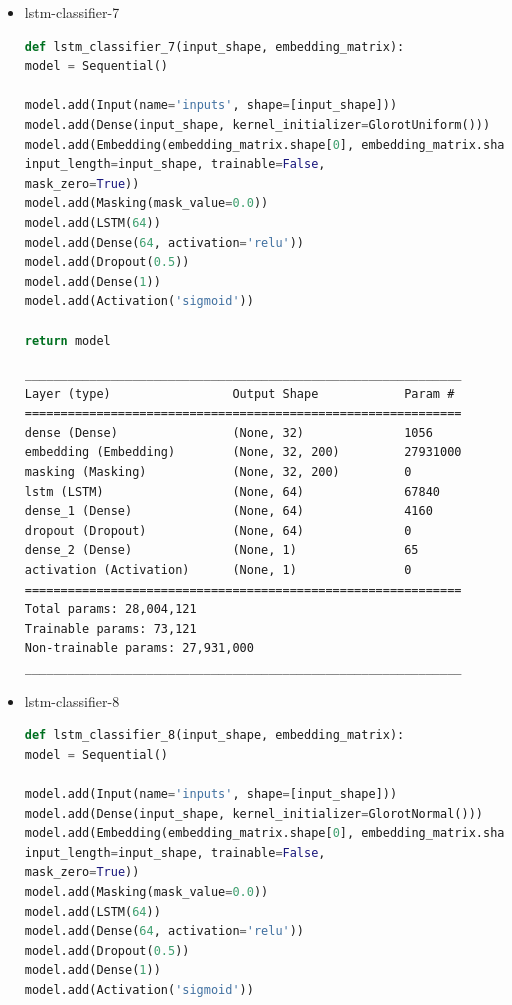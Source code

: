 \documentclass{article}
\begin{document}
\begin{itemize}
\item lstm-classifier-7

\begin{lstlisting}[language=Python, caption=Дефиниция на lstm-classifier-7.]
def lstm_classifier_7(input_shape, embedding_matrix):
model = Sequential()

model.add(Input(name='inputs', shape=[input_shape]))
model.add(Dense(input_shape, kernel_initializer=GlorotUniform()))
model.add(Embedding(embedding_matrix.shape[0], embedding_matrix.shape[1], weights=[embedding_matrix],
input_length=input_shape, trainable=False,
mask_zero=True))
model.add(Masking(mask_value=0.0))
model.add(LSTM(64))
model.add(Dense(64, activation='relu'))
model.add(Dropout(0.5))
model.add(Dense(1))
model.add(Activation('sigmoid'))

return model
\end{lstlisting}

\begin{lstlisting}[numbers=none, caption=Обобщение на lstm-classifier-7.]
_____________________________________________________________
Layer (type)                 Output Shape            Param #
=============================================================
dense (Dense)                (None, 32)              1056
embedding (Embedding)        (None, 32, 200)         27931000
masking (Masking)            (None, 32, 200)         0
lstm (LSTM)                  (None, 64)              67840
dense_1 (Dense)              (None, 64)              4160
dropout (Dropout)            (None, 64)              0
dense_2 (Dense)              (None, 1)               65
activation (Activation)      (None, 1)               0
=============================================================
Total params: 28,004,121
Trainable params: 73,121
Non-trainable params: 27,931,000
_____________________________________________________________
\end{lstlisting}

\item lstm-classifier-8

\begin{lstlisting}[language=Python, caption=Дефиниция на lstm-classifier-8.]
def lstm_classifier_8(input_shape, embedding_matrix):
model = Sequential()

model.add(Input(name='inputs', shape=[input_shape]))
model.add(Dense(input_shape, kernel_initializer=GlorotNormal()))
model.add(Embedding(embedding_matrix.shape[0], embedding_matrix.shape[1], weights=[embedding_matrix],
input_length=input_shape, trainable=False,
mask_zero=True))
model.add(Masking(mask_value=0.0))
model.add(LSTM(64))
model.add(Dense(64, activation='relu'))
model.add(Dropout(0.5))
model.add(Dense(1))
model.add(Activation('sigmoid'))


\end{lstlisting}
\end{itemize}
\end{document}
